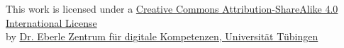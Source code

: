 

\begin{center}
  This work is licensed under a
  \href{http://creativecommons.org/licenses/by-sa/4.0/}{Creative Commons Attribution-ShareAlike 4.0 International License}
  \\
  by
  \href{https://uni-tuebingen.de/de/151602}{Dr. Eberle Zentrum für digitale Kompetenzen, Universität Tübingen}
\end{center}
